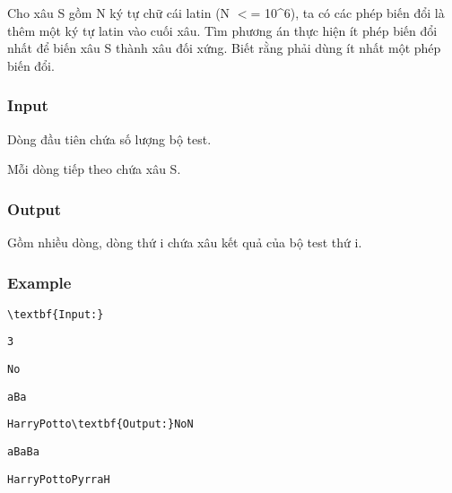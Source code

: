 

Cho xâu S gồm N ký tự chữ cái latin (N $<$= 10\textasciicircum6), ta có các phép biến đổi là thêm một ký tự latin vào cuối xâu. Tìm phương án thực hiện ít phép biến đổi nhất để biến xâu S thành xâu đối xứng. Biết rằng phải dùng ít nhất một phép biến đổi.

\subsubsection{Input}

Dòng đầu tiên chứa số lượng bộ test.

Mỗi dòng tiếp theo chứa xâu S.

\subsubsection{Output}

Gồm nhiều dòng, dòng thứ i chứa xâu kết quả của bộ test thứ i.

\subsubsection{Example}
\begin{verbatim}
\textbf{Input:}\end{verbatim}
\begin{verbatim}
3\end{verbatim}
\begin{verbatim}
No\end{verbatim}
\begin{verbatim}
aBa\end{verbatim}
\begin{verbatim}
HarryPotto\textbf{Output:}NoN\end{verbatim}
\begin{verbatim}
aBaBa\end{verbatim}
\begin{verbatim}
HarryPottoPyrraH\end{verbatim}